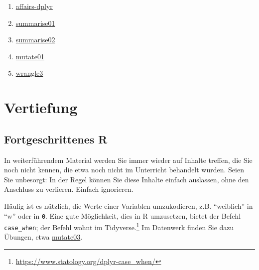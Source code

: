 \documentclass[
  letterpaper,
  twoside,
  open=any]{scrbook}
\theoremstyle{definition}
\theoremstyle{definition}
\theoremstyle{definition}
\theoremstyle{remark}
\begin{document}
\begin{enumerate}
\item
  \href{https://sebastiansauer.github.io/Datenwerk/posts/affairs-dplyr/affairs-dplyr.html}{affairs-dplyr}
\item
  \href{https://sebastiansauer.github.io/Datenwerk/posts/summarise01/summarise01.html}{summarise01}
\item
  \href{https://sebastiansauer.github.io/Datenwerk/posts/summarise02/summarise02.html}{summarise02}
\item
  \href{https://sebastiansauer.github.io/Datenwerk/posts/mutate01/mutate01.html}{mutate01}
\item
  \href{https://sebastiansauer.github.io/Datenwerk/posts/wrangle3/wrangle3}{wrangle3}
\end{enumerate}

\section{Vertiefung}\label{vertiefung-2}

\subsection{Fortgeschrittenes R}\label{fortgeschrittenes-r}

\begin{tcolorbox}[enhanced jigsaw, colbacktitle=quarto-callout-note-color!10!white, colframe=quarto-callout-note-color-frame, coltitle=black, arc=.35mm, breakable, opacitybacktitle=0.6, toprule=.15mm, colback=white, rightrule=.15mm, opacityback=0, toptitle=1mm, title=\textcolor{quarto-callout-note-color}{\faInfo}\hspace{0.5em}{Hinweis}, titlerule=0mm, bottomtitle=1mm, bottomrule=.15mm, leftrule=.75mm, left=2mm]

In weiterführendem Material werden Sie immer wieder auf Inhalte treffen,
die Sie noch nicht kennen, die etwa noch nicht im Unterricht behandelt
wurden. Seien Sie unbesorgt: In der Regel können Sie diese Inhalte
einfach auslassen, ohne den Anschluss zu verlieren. Einfach ignorieren.

\end{tcolorbox}

Häufig ist es nützlich, die Werte einer Variablen umzukodieren, z.B.
\enquote{weiblich} in \enquote{w} oder in \texttt{0}. Eine gute
Möglichkeit, dies in R umzusetzen, bietet der Befehl
\texttt{case\_when}; der Befehl wohnt im Tidyverse.\footnote{\url{https://www.statology.org/dplyr-case_when/}}
Im Datenwerk finden Sie dazu Übungen, etwa
\href{https://sebastiansauer.github.io/Datenwerk/posts/mutate03/mutate03.html}{mutate03}.
\end{document}
